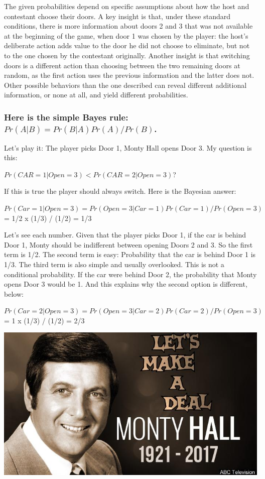 \documentclass[
]{book}
\begin{document}
The given probabilities depend on specific assumptions about how the host and contestant choose their doors. A key insight is that, under these standard conditions, there is more information about doors 2 and 3 that was not available at the beginning of the game, when door 1 was chosen by the player: the host's deliberate action adds value to the door he did not choose to eliminate, but not to the one chosen by the contestant originally. Another insight is that switching doors is a different action than choosing between the two remaining doors at random, as the first action uses the previous information and the latter does not. Other possible behaviors than the one described can reveal different additional information, or none at all, and yield different probabilities.

\hypertarget{here-is-the-simple-bayes-rule-prab-prbapraprb.}{%
\subsubsection*{\texorpdfstring{Here is the simple Bayes rule: \(Pr(A|B) = Pr(B|A)Pr(A)/Pr(B)\).}{Here is the simple Bayes rule: Pr(A\textbar B) = Pr(B\textbar A)Pr(A)/Pr(B).}}\label{here-is-the-simple-bayes-rule-prab-prbapraprb.}}

Let's play it: The player picks Door 1, Monty Hall opens Door 3. My question is this:

\(Pr(CAR = 1|Open = 3) < Pr(CAR = 2|Open = 3)\)?

If this is true the player should always switch. Here is the Bayesian answer:

\(Pr(Car=1|Open=3) = Pr(Open=3|Car=1)Pr(Car=1)/Pr(Open=3)\) = 1/2 x (1/3) / (1/2) = 1/3

Let's see each number. Given that the player picks Door 1, if the car is behind Door 1, Monty should be indifferent between opening Doors 2 and 3. So the first term is 1/2. The second term is easy: Probability that the car is behind Door 1 is 1/3. The third term is also simple and usually overlooked. This is not a conditional probability. If the car were behind Door 2, the probability that Monty opens Door 3 would be 1. And this explains why the second option is different, below:

\(Pr(Car=2|Open=3) = Pr(Open=3|Car=2)Pr(Car=2)/Pr(Open=3)\) = 1 x (1/3) / (1/2) = 2/3

\includegraphics[width=9.58in]{png/montyhall}
\end{document}
